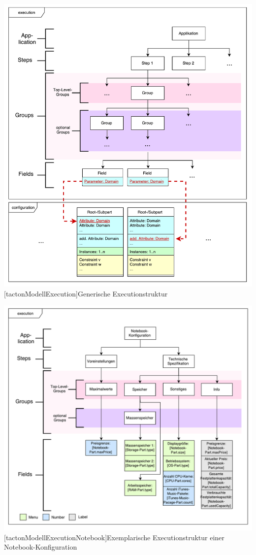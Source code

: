 \documentclass[12pt,a4paper,bibliography=totocnumbered,listof=totoc]{scrartcl}
\begin{document}
\vspace{1em}
\begin{minipage}{\linewidth}
	\centering
	\includegraphics[width=1\linewidth]{Abbildungen/tactonModellExecution.pdf}
	[tactonModellExecution]{Generische Executionstruktur}
	\label{fig:tactonModellExecution}
\end{minipage}
\begin{minipage}{\linewidth}
	\centering
	\includegraphics[width=0.8\linewidth]{Abbildungen/tactonModellExecutionNotebook.pdf}
	[tactonModellExecutionNotebook]{Exemplarische Executionstruktur einer Notebook-Konfiguration}
	\label{fig:tactonModellExecutionNotebook}
\end{minipage}
\vspace{1em}
\end{document}
